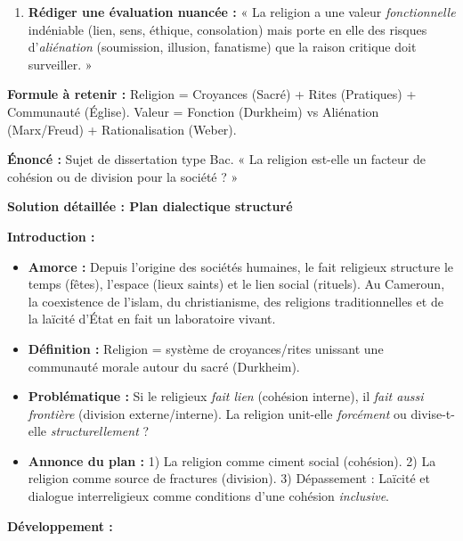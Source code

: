 \documentclass[11pt]{article}
\newcommand{\cle}[1]{{\popxbold\color{popdark}#1}}
\begin{document}
\begin{methode}
\begin{enumerate}
\begin{center}
\begin{tabularx}{\linewidth}{|l|X|X|}
    \end{tabularx}
    \end{center}
    \item \textbf{Rédiger une évaluation nuancée :} « La religion a une valeur \emph{fonctionnelle} indéniable (lien, sens, éthique, consolation) mais porte en elle des risques d'\emph{aliénation} (soumission, illusion, fanatisme) que la raison critique doit surveiller. »
\end{enumerate}
\textbf{Formule à retenir :} \cle{Religion = Croyances (Sacré) + Rites (Pratiques) + Communauté (Église)}. \cle{Valeur = Fonction (Durkheim) vs Aliénation (Marx/Freud) + Rationalisation (Weber)}.
\end{methode}

\begin{exoresolu}
\textbf{Énoncé :} Sujet de dissertation type Bac. « La religion est-elle un facteur de cohésion ou de division pour la société ? »

\tcblower
\textbf{Solution détaillée : Plan dialectique structuré}

\textbf{Introduction :}
\begin{itemize}
    \item \textbf{Amorce :} Depuis l'origine des sociétés humaines, le fait religieux structure le temps (fêtes), l'espace (lieux saints) et le lien social (rituels). Au Cameroun, la coexistence de l'islam, du christianisme, des religions traditionnelles et de la laïcité d'État en fait un laboratoire vivant.
    \item \textbf{Définition :} Religion = système de croyances/rites unissant une communauté morale autour du sacré (Durkheim).
    \item \textbf{Problématique :} Si le religieux \emph{fait lien} (cohésion interne), il \emph{fait aussi frontière} (division externe/interne). La religion unit-elle \emph{forcément} ou divise-t-elle \emph{structurellement} ?
    \item \textbf{Annonce du plan :} 1) La religion comme ciment social (cohésion). 2) La religion comme source de fractures (division). 3) Dépassement : Laïcité et dialogue interreligieux comme conditions d'une cohésion \emph{inclusive}.
\end{itemize}

\textbf{Développement :}


\end{exoresolu}
\end{document}
